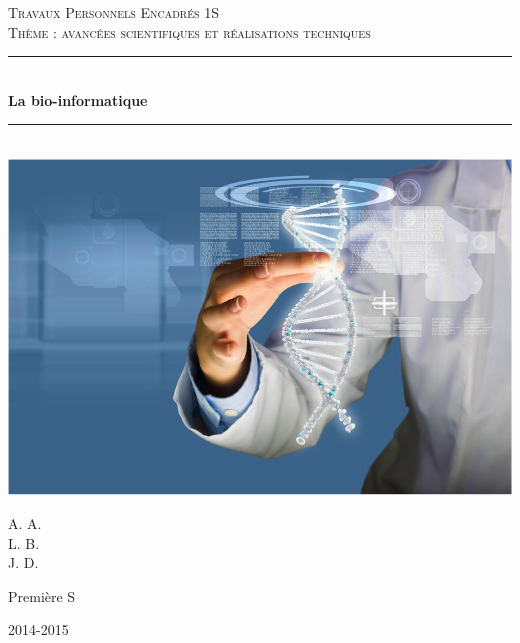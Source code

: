 \documentclass[12pt, openany]{report}
\newcommand{\HRule}{\rule{\linewidth}{0.5mm}}
\begin{document}
\begin{titlepage}
  \begin{sffamily}
  \begin{center}


    \textsc{\LARGE Travaux Personnels Encadrés 1\degre S}\\[2cm]

    \textsc{\Large Thème : avancées scientifiques et réalisations techniques}\\[1.5cm]

    \HRule \\[0.4cm]
    { \huge \bfseries La bio-informatique\\[0.4cm] }

    \HRule \\[2cm]
    \includegraphics[scale=1]{Images/im1.png}
    \\[2cm]

    \begin{minipage}{0.4\textwidth}
      \begin{flushleft} \large
        A. A.\\
L. B.\\
J. D.\\
      \end{flushleft}
    \end{minipage}
    \begin{minipage}{0.4\textwidth}
      \begin{flushright} \large
Première S\\
      \end{flushright}
    \end{minipage}

    \vfill

    {\large 2014-2015}

  \end{center}
  \end{sffamily}
\end{titlepage}
\end{document}
